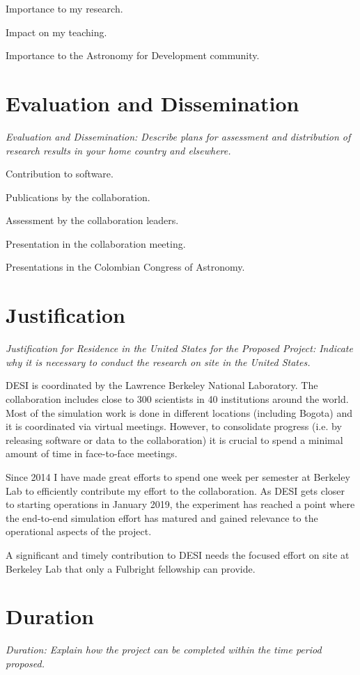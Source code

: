 \documentclass[12pt]{article}
\begin{document}
Importance to my research.

Impact on my teaching.

Importance to the Astronomy for Development community.

\section*{Evaluation and Dissemination}
\textit{Evaluation and Dissemination: Describe plans for assessment and
distribution of research results in your home country and elsewhere.}

Contribution to software.

Publications by the collaboration.

Assessment by the collaboration leaders. 

Presentation in the collaboration meeting.

Presentations in the Colombian Congress of Astronomy. 



\section*{Justification}
\textit{Justification for Residence in the United States for the Proposed
Project: Indicate why it is necessary to conduct the research on site
 in the United States. }

DESI is coordinated by the Lawrence Berkeley National Laboratory. The
collaboration includes close to 300 scientists in 40 institutions
around the world. 
Most of the simulation work is done in different locations (including
Bogota) and it is coordinated via virtual meetings.  
However, to consolidate progress (i.e. by releasing software or data
to the collaboration) it is crucial to spend a minimal amount of time
in face-to-face meetings. 

Since 2014 I have made great efforts to spend one week per semester at
Berkeley Lab to efficiently contribute my effort to the collaboration. 
As DESI gets closer to starting operations in January 2019, the
experiment has reached a point where the end-to-end simulation effort
has matured and gained relevance to the operational aspects of the
project. 

A significant and timely contribution to DESI needs the focused effort on
site at Berkeley Lab that only a Fulbright fellowship can provide. 

\section*{Duration}
\textit{ Duration: Explain how the project can be completed within the time
period proposed. }
\end{document}
